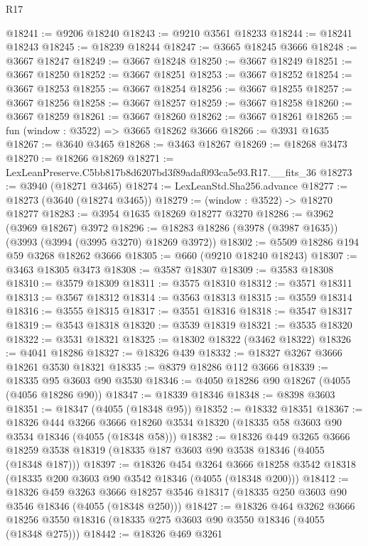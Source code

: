 \begin{lexlean}{R17}
\begin{coremodule}
@18241 := @9206 @18240
@18243 := @9210 @3561 @18233
@18244 := @18241 @18243
@18245 := @18239 @18244
@18247 := @3665 @18245 @3666
@18248 := @3667 @18247
@18249 := @3667 @18248
@18250 := @3667 @18249
@18251 := @3667 @18250
@18252 := @3667 @18251
@18253 := @3667 @18252
@18254 := @3667 @18253
@18255 := @3667 @18254
@18256 := @3667 @18255
@18257 := @3667 @18256
@18258 := @3667 @18257
@18259 := @3667 @18258
@18260 := @3667 @18259
@18261 := @3667 @18260
@18262 := @3667 @18261
@18265 := fun (window : @3522) => @3665 @18262 @3666
@18266 := @3931 @1635
@18267 := @3640 @3465
@18268 := @3463 @18267
@18269 := @18268 @3473
@18270 := @18266 @18269
@18271 := LexLeanPreserve.C5bb817b8d6207bd3f89adaf093ca5e93.R17.__fits_36
@18273 := @3940 (@18271 @3465)
@18274 := LexLeanStd.Sha256.advance
@18277 := @18273 (@3640 (@18274 @3465))
@18279 := (window : @3522) -> @18270 @18277
@18283 := @3954 @1635 @18269 @18277 @3270
@18286 := @3962 (@3969 @18267) @3972
@18296 := @18283 @18286 (@3978 (@3987 @1635)) (@3993 (@3994 (@3995 @3270) @18269 @3972))
@18302 := @5509 @18286 @194 @59 @3268 @18262 @3666
@18305 := @660 (@9210 @18240 @18243)
@18307 := @3463 @18305 @3473
@18308 := @3587 @18307
@18309 := @3583 @18308
@18310 := @3579 @18309
@18311 := @3575 @18310
@18312 := @3571 @18311
@18313 := @3567 @18312
@18314 := @3563 @18313
@18315 := @3559 @18314
@18316 := @3555 @18315
@18317 := @3551 @18316
@18318 := @3547 @18317
@18319 := @3543 @18318
@18320 := @3539 @18319
@18321 := @3535 @18320
@18322 := @3531 @18321
@18325 := @18302 @18322 (@3462 @18322)
@18326 := @4041 @18286
@18327 := @18326 @439
@18332 := @18327 @3267 @3666 @18261 @3530 @18321
@18335 := @8379 @18286 @112 @3666
@18339 := @18335 @95 @3603 @90 @3530
@18346 := @4050 @18286 @90 @18267 (@4055 (@4056 @18286 @90))
@18347 := @18339 @18346
@18348 := @8398 @3603
@18351 := @18347 (@4055 (@18348 @95))
@18352 := @18332 @18351
@18367 := @18326
    @444
    @3266
    @3666
    @18260
    @3534
    @18320
    (@18335 @58 @3603 @90 @3534 @18346 (@4055 (@18348 @58)))
@18382 := @18326
    @449
    @3265
    @3666
    @18259
    @3538
    @18319
    (@18335 @187 @3603 @90 @3538 @18346 (@4055 (@18348 @187)))
@18397 := @18326
    @454
    @3264
    @3666
    @18258
    @3542
    @18318
    (@18335 @200 @3603 @90 @3542 @18346 (@4055 (@18348 @200)))
@18412 := @18326
    @459
    @3263
    @3666
    @18257
    @3546
    @18317
    (@18335 @250 @3603 @90 @3546 @18346 (@4055 (@18348 @250)))
@18427 := @18326
    @464
    @3262
    @3666
    @18256
    @3550
    @18316
    (@18335 @275 @3603 @90 @3550 @18346 (@4055 (@18348 @275)))
@18442 := @18326
    @469
    @3261

\end{coremodule}
\end{lexlean}
